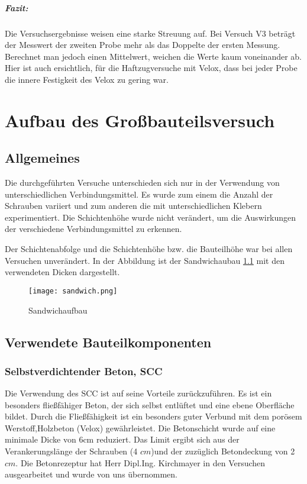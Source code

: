 \documentclass[12 pt,a4 paper ]{scrreprt}
\begin{document}
\newpage{}

\paragraph{Fazit:}

Die Versuchsergebnisse weisen eine starke Streuung auf. Bei Versuch V3 beträgt der Messwert der zweiten Probe mehr als das Doppelte der ersten Messung. Berechnet man jedoch einen Mittelwert, weichen die Werte kaum voneinander ab. Hier ist auch ersichtlich, für die Haftzugversuche mit Velox, dass bei jeder Probe die innere Festigkeit des Velox zu gering war. 


\chapter{Aufbau des Großbauteilsversuch}

\section{Allgemeines}

Die durchgeführten Versuche unterschieden sich nur in der Verwendung von unterschiedlichen Verbindungsmittel. Es wurde zum einem die Anzahl der Schrauben variiert und zum anderen die mit unterschiedlichen Klebern experimentiert. Die Schichtenhöhe wurde nicht verändert, um die Auswirkungen der verschiedene Verbindungsmittel zu erkennen.

Der Schichtenabfolge und die Schichtenhöhe bzw. die Bauteilhöhe war bei allen Versuchen unverändert. In der Abbildung ist der Sandwichaubau \ref{sandwichaufbau} mit den verwendeten Dicken dargestellt.

\begin{figure}[h]
\begin{center}
\texttt{[image: sandwich.png]}
\caption{Sandwichaufbau}
\label{sandwichaufbau}
\end{center}
\end{figure}



\section{Verwendete Bauteilkomponenten}
\subsection{Selbstverdichtender Beton, SCC}

Die Verwendung des SCC ist auf seine Vorteile zurückzuführen. Es ist ein besonders fließfähiger Beton, der sich selbst entlüftet und eine ebene Oberfläche bildet. Durch die Fließfähigkeit ist ein besonders guter Verbund mit dem porösem Werstoff,Holzbeton (Velox) gewährleistet. Die Betonschicht wurde auf eine minimale Dicke von 6cm reduziert. Das Limit ergibt sich aus der Verankerungslänge der Schrauben (4 $cm$)und der zuzüglich  Betondeckung von 2 $ cm $. Die Betonrezeptur hat Herr Dipl.Ing. Kirchmayer in den Versuchen ausgearbeitet und wurde von uns übernommen.
\end{document}
